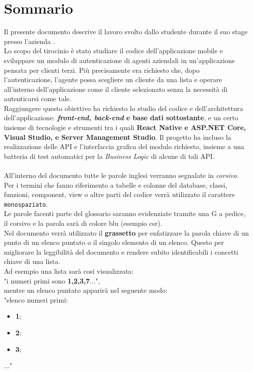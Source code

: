 \cleardoublepage
{}
{}
\begingroup
\let\clearpage\relax
\let\cleardoublepage\relax
\chapter*{Sommario}

Il presente documento descrive il lavoro svolto dallo studente {\myName} durante il suo stage presso l’azienda {\companyLong}.\\
Lo scopo del tirocinio è stato studiare il codice dell’applicazione mobile {\movi} e sviluppare un modulo di autenticazione di agenti aziendali 
in un'applicazione pensata per clienti terzi. Più precisamente era richiesto che, dopo l’autenticazione, l’agente possa scegliere un cliente da una 
lista e operare all’interno dell’applicazione come il cliente selezionato senza la necessità di autenticarsi come tale.\\
Raggiungere questo obiettivo ha richiesto lo studio del codice e dell’architettura dell’applicazione: \textbf{\textit{front-end, back-end} e base dati 
sottostante}, e un certo insieme di tecnologie e strumenti tra i quali \textbf{React Native e ASP.NET Core, Visual Studio, e Server Management Studio}. 
Il progetto ha incluso la realizzazione delle API e l’interfaccia grafica del modulo richiesto, insieme a una batteria di test automatici per la 
\textit{Business Logic} di alcune di tali API.\\\\

All'interno del documento tutte le parole inglesi verranno segnalate in \textit{corsivo}.\\
Per i termini che fanno riferimento a tabelle e colonne del database, classi, funzioni, component, view o altre parti del 
codice verrà utilizzato il carattere \texttt{monospaziato}.\\
Le parole facenti parte del glossario saranno evidenziate tramite una G a pedice, il corsivo e la parola sarà di colore blu (esempio \gls{csr}).\\
Nel documento verrà utilizzato il \textbf{grassetto} per enfatizzare la parola chiave di un punto di un elenco puntato o il singolo elemento di un elenco. 
Questo per migliorare la leggibilità del documento e rendere subito identificabili i concetti chiave di una lista.\\
Ad esempio una lista sarà cosi visualizzata:\\
"i numeri primi sono \textbf{1,2,3,7}...", \\
mentre un elenco puntato apparirà nel seguente modo:\\
"elenco numeri primi:
\begin{itemize}
    \item \textbf{1};\item \textbf{2};\item \textbf{3};
\end{itemize}
..."\\\\


